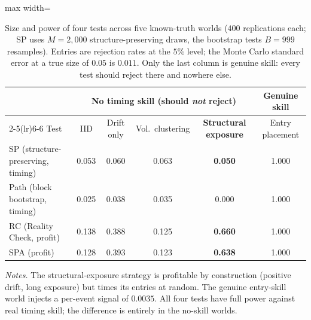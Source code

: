 \documentclass[preprint,12pt]{elsarticle}
\theoremstyle{definition}
\begin{document}
\begin{table}[H]
\centering
\caption{Size and power of four tests across five known-truth worlds ($400$ replications each; SP uses $M=2{,}000$ structure-preserving draws, the bootstrap tests $B=999$ resamples). Entries are rejection rates at the $5\%$ level; the Monte Carlo standard error at a true size of $0.05$ is $0.011$. Only the last column is genuine skill: every test should reject there and nowhere else.}
\label{tab:competitor}
{\small
\renewcommand{\arraystretch}{1.15}
\begin{adjustbox}{max width=\textwidth}
\begin{tabular}{@{}lccccc@{}}
\toprule
& \multicolumn{4}{c}{No timing skill (should \emph{not} reject)} & Genuine skill \\
\cmidrule(lr){2-5}\cmidrule(lr){6-6}
Test & IID & Drift only & Vol.\ clustering & \textbf{Structural exposure} & Entry placement \\
\midrule
SP (structure-preserving, timing) & 0.053 & 0.060 & 0.063 & \textbf{0.050} & 1.000 \\
Path (block bootstrap, timing)    & 0.025 & 0.038 & 0.035 & 0.000 & 1.000 \\
RC (Reality Check, profit)        & 0.138 & 0.388 & 0.125 & \textbf{0.660} & 1.000 \\
SPA (profit)                      & 0.128 & 0.393 & 0.123 & \textbf{0.638} & 1.000 \\
\bottomrule
\end{tabular}
\end{adjustbox}
}
\par\vspace{0.5em}
\begin{minipage}{0.95\textwidth}
\centering
\footnotesize\emph{Notes.} The structural-exposure strategy is profitable by construction (positive drift, long exposure) but times its entries at random. The genuine entry-skill world injects a per-event signal of $0.0035$. All four tests have full power against real timing skill; the difference is entirely in the no-skill worlds.
\end{minipage}
\end{table}
\end{document}
